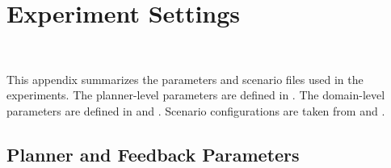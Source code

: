 \section{Experiment Settings}~\label{appx:expset}

This appendix summarizes the parameters and scenario files used in the experiments. The planner-level parameters are defined in . The domain-level parameters are defined in  and . Scenario configurations are taken from  and .

\subsection{Planner and Feedback Parameters}~\label{app:planner_params}

